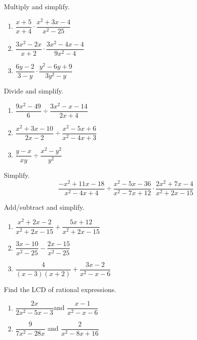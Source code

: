 \documentclass[en,12pt]{elegantbook}
\providecommand{\tightlist}{%
  \setlength{\itemsep}{0pt}\setlength{\parskip}{0pt}}
\providecommand{\tightlist}{%
  \setlength{\itemsep}{0pt}\setlength{\parskip}{0pt}}
\let\BeginKnitrBlock\begin \let\EndKnitrBlock\end
\begin{document}
\BeginKnitrBlock{exercise}
\protect\hypertarget{exr:unnamed-chunk-55}{}{\label{exr:unnamed-chunk-55} }
Multiply and simplify.

\begin{enumerate}
\def\labelenumi{\arabic{enumi}.}
\item
  \(\dfrac{x+5}{x+4}\cdot\dfrac{x^2+3x-4}{x^2-25}\)
\item
  \(\dfrac{3x^2-2x}{x+2}\cdot\dfrac{3x^2-4x-4}{9x^2-4}\)
\item
  \(\dfrac{6y-2}{3-y}\cdot\dfrac{y^2-6y+9}{3y^2-y}\)
\end{enumerate}
\EndKnitrBlock{exercise}

\BeginKnitrBlock{exercise}
\protect\hypertarget{exr:unnamed-chunk-56}{}{\label{exr:unnamed-chunk-56} }
Divide and simplify.

\begin{enumerate}
\def\labelenumi{\arabic{enumi}.}
\item
  \(\dfrac{9x^2-49}{6}\div\dfrac{3x^2-x-14}{2x+4}\)
\item
  \(\dfrac{x^2+3x-10}{2x-2}\div\dfrac{x^2-5x+6}{x^2-4x+3}\)
\item
  \(\dfrac{y-x}{xy}\div\dfrac{x^2-y^2}{y^2}\)
\end{enumerate}
\EndKnitrBlock{exercise}

\BeginKnitrBlock{exercise}
\protect\hypertarget{exr:unnamed-chunk-57}{}{\label{exr:unnamed-chunk-57} }
Simplify.
\[
\frac{-x^2+11x-18}{x^2-4x+4}\div \frac{x^2-5x-36}{x^2-7x+12}\cdot \frac{2x^2+7x-4}{x^2+2x-15}
\]
\EndKnitrBlock{exercise}

\BeginKnitrBlock{exercise}
\protect\hypertarget{exr:unnamed-chunk-58}{}{\label{exr:unnamed-chunk-58} }
Add/subtract and simplify.

\begin{enumerate}
\def\labelenumi{\arabic{enumi}.}
\tightlist
\item
  \(\dfrac{x^2+2x-2}{x^2+2x-15}+\dfrac{5x+12}{x^2+2x-15}\)
\item
  \(\dfrac{3x-10}{x^2-25}-\dfrac{2x-15}{x^2-25}\)
\item
  \(\dfrac{4}{(x-3)(x+2)}+\dfrac{3x-2}{x^2-x-6}\)
\end{enumerate}
\EndKnitrBlock{exercise}

\BeginKnitrBlock{exercise}
\protect\hypertarget{exr:unnamed-chunk-59}{}{\label{exr:unnamed-chunk-59} }
Find the LCD of rational expressions.

\begin{enumerate}
\def\labelenumi{\arabic{enumi}.}
\tightlist
\item
  \(\dfrac{2x}{2x^2-5x-3}\)\quad and \quad \(\dfrac{x-1}{x^2-x-6}\)
\item
  \(\dfrac{9}{7x^2-28x}\) \quad and \quad \(\dfrac{2}{x^2-8x+16}\)
\end{enumerate}
\EndKnitrBlock{exercise}
\end{document}
